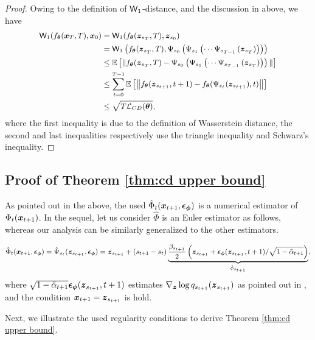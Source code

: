 \expectedcdgap*
\begin{proof}
	Owing to the definition of $\mathsf{W}_{1}$-distance, and the discussion in above, we have 
	\begin{equation}
		\small
		\begin{aligned}
			\mathsf{W}_{1}(f_{\boldsymbol{\theta}}(\boldsymbol{x}_{T}, T), \boldsymbol{x}_{0}) & = \mathsf{W}_{1}(f_{\boldsymbol{\theta}}(\boldsymbol{z}_{s_{T}}, T), \boldsymbol{z}_{s_{0}}) \\
            & = \mathsf{W}_{1}\left(f_{\boldsymbol{\theta}}(\boldsymbol{z}_{s_{T}}, T), \Psi_{s_{0}}\left(\Psi_{s_{1}}\left(\cdots\Psi_{s_{T - 1}}\left(\boldsymbol{z}_{s_{T}}\right)\right)\right)\right) \\
			& \leq \mathbb{E}\left[\|f_{\boldsymbol{\theta}}(\boldsymbol{z}_{s_{T}}, T) - \Psi_{s_{0}}\left(\Psi_{s_{1}}\left(\cdots\Psi_{s_{T - 1}}\left(\boldsymbol{z}_{s_{T}}\right)\right)\right)\|\right] \\
			& \leq \sum_{t = 0}^{T - 1}\mathbb{E}\left[\left\|f_{\boldsymbol{\theta}}(\boldsymbol{z}_{s_{t + 1}}, t + 1) - f_{\boldsymbol{\theta}}(\Psi_{s_{t}}(\boldsymbol{z}_{s_{t + 1}}), t)\right\|\right] \\
			& \leq \sqrt{T\mathcal{L}_{CD}(\boldsymbol{\theta})},
		\end{aligned}
	\end{equation}
	where the first inequality is due to the definition of Wasserstein distance, the second and last inequalities respectively use the triangle inequality and Schwarz's inequality.  
\end{proof}


\subsection{Proof of Theorem \ref{thm:cd upper bound}}\label{app:proof of cd upper bound}
As pointed out in the above, the used $\hat{\Phi}_{t}(\boldsymbol{x}_{t + 1}, \boldsymbol{\epsilon}_{\boldsymbol{\phi}})$ is a numerical estimator of $\Phi_{t}(\boldsymbol{x}_{t + 1})$. In the sequel, let us consider $\hat{\Phi}$ is an Euler estimator as follows, whereas our analysis can be similarly generalized to the other estimators. 

    \begin{equation}\label{eq:estimated phi}
		\small
			\hat{\Phi}_{t}(\boldsymbol{x}_{t + 1}, \boldsymbol{\epsilon}_{\boldsymbol{\phi}}) = \hat{\Psi}_{s_{t}}(\boldsymbol{z}_{s_{t + 1}}, \boldsymbol{\epsilon}_{\boldsymbol{\phi}}) = \boldsymbol{z}_{s_{t + 1}} + (s_{t + 1} - s_{t})\underbrace{\frac{\beta_{s_{t + 1}}}{2}\left(\boldsymbol{z}_{s_{t + 1}} + \boldsymbol{\epsilon}_{\boldsymbol{\phi}}(\boldsymbol{z}_{s_{t + 1}}, t + 1) / \sqrt{1 - \bar{\alpha}_{t + 1}}\right)}_{\hat{\phi}_{s_{t + 1}}}, 
	\end{equation}
	where $\sqrt{1 - \bar{\alpha}_{t + 1}}\boldsymbol{\epsilon}_{\boldsymbol{\phi}}(\boldsymbol{z}_{s_{t + 1}}, t + 1)$ estimates $\nabla_{\boldsymbol{z}}\log{q_{s_{t + 1}}(\boldsymbol{z}_{s_{t + 1}})}$ as pointed out in \citep{song2020score}, and the condition $\boldsymbol{x}_{t + 1} = \boldsymbol{z}_{s_{t + 1}}$ is hold. 
    \par
    Next, we illustrate the used regularity conditions to derive Theorem \ref{thm:cd upper bound}.
    
